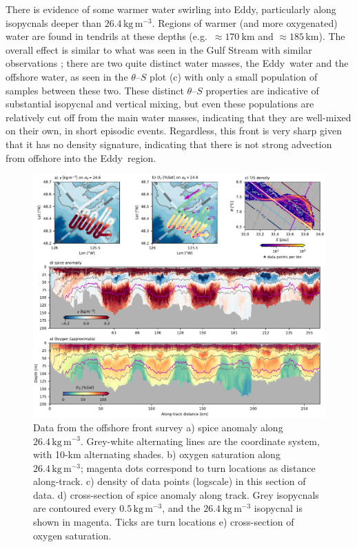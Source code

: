 \documentclass[draft]{agujournal2019}
\newcommand*{\Eddy}{{\sc Eddy}}
\begin{document}
There is evidence of some warmer water swirling into \Eddy, particularly along isopycnals deeper than $26.4\,\mathrm{kg\,m^{-3}}$.  Regions of warmer (and more oxygenated) water are found in tendrils at these depths (e.g.\ $\approx 170\ \mathrm{km}$ and $\approx 185\,\mathrm{km}$).  The overall effect is similar to what was seen in the Gulf Stream with similar observations \cite{klymaketal16}; there are two quite distinct water masses, the \Eddy\ water and the offshore water, as seen in the $\theta$--$S$ plot (c) with only a small population of samples between these two.  These distinct $\theta$--$S$ properties are indicative of substantial isopycnal and vertical mixing, but even these populations are relatively cut off from the main water masses, indicating that they are well-mixed on their own, in short episodic events.  Regardless, this front is very sharp given that it has no density signature, indicating that there is not strong advection from offshore into the \Eddy\ region.

\begin{figure}[htbp]
  \begin{center}
    \includegraphics[width=6.2in]{Frontsurvey}
    \caption{Data from the offshore front survey  a) spice anomaly along $26.4\,\mathrm{kg\,m^{-3}}$.  Grey-white alternating lines are the coordinate system, with 10-km alternating shades.   b) oxygen saturation along $26.4\,\mathrm{kg\,m^{-3}}$; magenta dots correspond to turn locations as distance along-track. c) density of data points (logscale) in this section of data.  d) cross-section of spice anomaly along track.  Grey isopycnals are contoured every $0.5\,\mathrm{kg\,m^{-3}}$, and the $26.4\,\mathrm{kg\,m^{-3}}$ isopycnal is shown in magenta. Ticks are turn locations e) cross-section of oxygen saturation.
      \label{fig:Frontsurvey} }
  \end{center}
\end{figure}
\end{document}
